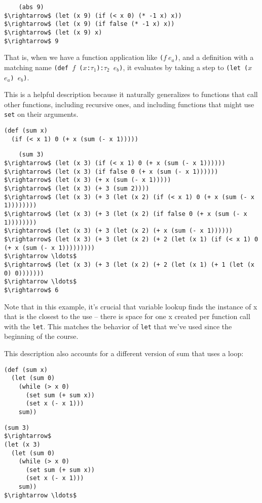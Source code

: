 \documentclass[10pt, oneside]{article}
\begin{document}
\begin{lstlisting}
    (abs 9)
$\rightarrow$ (let (x 9) (if (< x 0) (* -1 x) x))
$\rightarrow$ (let (x 9) (if false (* -1 x) x))
$\rightarrow$ (let (x 9) x)
$\rightarrow$ 9
\end{lstlisting}

That is, when we have a function application like \texttt{($f\ e_a$)}, and a
definition with a matching name \texttt{(def $f$ ($x$:$\tau_1$):$\tau_2$ $e_b$)}, it
evaluates by taking a step to \texttt{(let ($x$ $e_a$) $e_b$)}.

This is a helpful description because it naturally generalizes to functions
that call other functions, including recursive ones, and including functions
that might use \texttt{set} on their arguments.

\begin{lstlisting}
(def (sum x)
  (if (< x 1) 0 (+ x (sum (- x 1)))))
\end{lstlisting}

\begin{lstlisting}
    (sum 3)
$\rightarrow$ (let (x 3) (if (< x 1) 0 (+ x (sum (- x 1))))))
$\rightarrow$ (let (x 3) (if false 0 (+ x (sum (- x 1))))))
$\rightarrow$ (let (x 3) (+ x (sum (- x 1)))))
$\rightarrow$ (let (x 3) (+ 3 (sum 2))))
$\rightarrow$ (let (x 3) (+ 3 (let (x 2) (if (< x 1) 0 (+ x (sum (- x 1))))))))
$\rightarrow$ (let (x 3) (+ 3 (let (x 2) (if false 0 (+ x (sum (- x 1))))))))
$\rightarrow$ (let (x 3) (+ 3 (let (x 2) (+ x (sum (- x 1))))))
$\rightarrow$ (let (x 3) (+ 3 (let (x 2) (+ 2 (let (x 1) (if (< x 1) 0 (+ x (sum (- x 1)))))))))
$\rightarrow \ldots$
$\rightarrow$ (let (x 3) (+ 3 (let (x 2) (+ 2 (let (x 1) (+ 1 (let (x 0) 0)))))))
$\rightarrow \ldots$
$\rightarrow$ 6
\end{lstlisting}

Note that in this example, it's crucial that variable lookup finds the
instance of x that is the closest to the use -- there is space for one x
created per function call with the \texttt{let}. This matches the behavior of
\texttt{let} that we've used since the beginning of the course.

This description also accounts for a different version of sum that uses a loop:

\begin{lstlisting}
(def (sum x)
  (let (sum 0)
    (while (> x 0)
      (set sum (+ sum x))
      (set x (- x 1)))
    sum))
\end{lstlisting}

\begin{lstlisting}
(sum 3)
$\rightarrow$
(let (x 3)
  (let (sum 0)
    (while (> x 0)
      (set sum (+ sum x))
      (set x (- x 1)))
    sum))
$\rightarrow \ldots$
\end{lstlisting}
\end{document}
